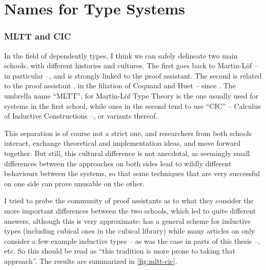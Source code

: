 \chapter{Names for Type Systems}\label{chap:names}

\subsection*{MLTT and CIC}


In the field of dependently types, I think we can safely delineate two main schools,
with different histories and cultures. The first goes back to Martin-Löf –
in particular  –, and is strongly linked to the 
proof assistant. The second is related to the proof assistant , in the filiation of
Coquand and Huet – since .
The umbrella name “MLTT”, for Martin-Löf Type Theory is the one usually used for systems
in the first school, while ones in the second tend to use “CIC” – Calculus of Inductive
Constructions –, or variants thereof.

This separation is of course not a strict one,
and researchers from both schools interact, exchange
theoretical and implementation ideas, and move forward together. But still, this cultural
difference is not anecdotal, as seemingly small differences between the approaches on both
sides lead to wildly different behaviours between the systems, so that some techniques
that are very successful on one side can prove unusable on the other.

I tried to probe the community of proof assistants%
as to what they consider the more important differences between the two schools,
which led to quite different answers,
although this is very approximate:  has a general scheme for inductive types
(including cubical ones in the cubical library) while many articles on  only
consider a few example inductive types – as was the case in parts of this thesis –, etc.
So this should be read as “this tradition is more prone to taking that approach”.
The results are summarized in \cref{fig:mltt-cic}.

